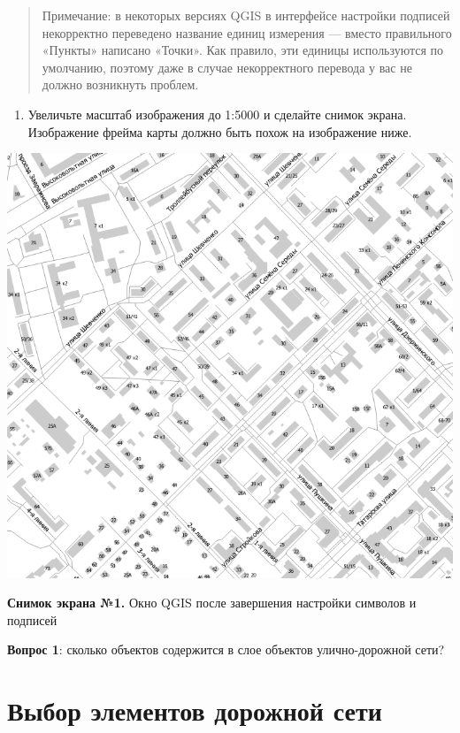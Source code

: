 \documentclass[
  12pt,
]{book}
\providecommand{\tightlist}{%
  \setlength{\itemsep}{0pt}\setlength{\parskip}{0pt}}
\begin{document}
\begin{quote}
Примечание: в некоторых версиях QGIS в интерфейсе настройки подписей некорректно переведено название единиц измерения --- вместо правильного «Пункты» написано «Точки». Как правило, эти единицы используются по умолчанию, поэтому даже в случае некорректного перевода у вас не должно возникнуть проблем.
\end{quote}

\begin{enumerate}
\def\labelenumi{\arabic{enumi}.}
\setcounter{enumi}{6}
\tightlist
\item
  Увеличьте масштаб изображения до 1:5000 и сделайте снимок экрана. Изображение фрейма карты должно быть похож на изображение ниже.
\end{enumerate}

\includegraphics{images/Ex11_RoadNetwork/visualization.png}

\textbf{Снимок экрана №1.} Окно QGIS после завершения настройки символов и подписей

\textbf{Вопрос 1}: сколько объектов содержится в слое объектов улично-дорожной сети?

\hypertarget{networks-query}{%
\section{Выбор элементов дорожной сети}\label{networks-query}}
\end{document}

